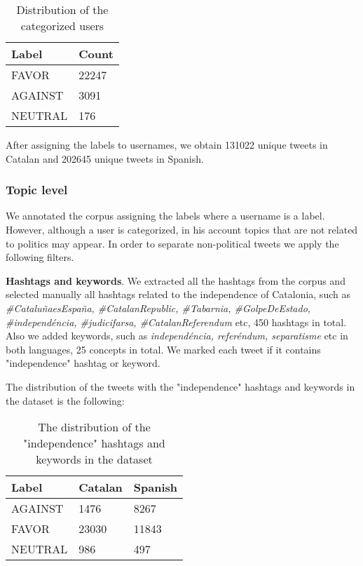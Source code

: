 \documentclass[10pt, a4paper]{article}
\begin{document}
\begin{table}[!h]
\begin{center}
\begin{tabularx}{\columnwidth}{|l|X|}

      \hline
      Label&Count\\
      \hline
      FAVOR & 22247 \\
      \hline
      AGAINST & 3091\\
      \hline
     NEUTRAL & 176\\
      \hline

\end{tabularx}
\caption{Distribution of the categorized users}
\label{table:users}
 \end{center}
\end{table}

After assigning the labels to usernames, we obtain 131022 unique tweets in Catalan and 202645 unique tweets in Spanish. 

\subsubsection{Topic level} 

We annotated the corpus assigning the labels where a username is a label. However, although a user is categorized, in his account topics that are not related to politics may appear. In order to separate non-political tweets we apply the following filters. 

\textbf{Hashtags and keywords}. We extracted all the hashtags from the corpus and selected manually all hashtags related to the independence of Catalonia, such as \textit{\#Catalu\~naesEspa\~na, \#CatalanRepublic, \#Tabarnia, \#GolpeDeEstado, \#independ\'encia, \#judicifarsa, \#CatalanReferendum} etc, 450 hashtags in total. Also we added keywords, such as \textit{independ\'encia, refer\'endum, separatisme} etc in both languages, 25 concepts in total. We marked each tweet if it contains "independence" hashtag or keyword. 

The distribution of the tweets with the "independence" hashtags and keywords in the dataset is the following: 

\begin{table}[!h]
\begin{center}
\begin{tabularx}{\columnwidth}{|l|l|X|}

      \hline
        Label&Catalan&Spanish\\
      \hline
        AGAINST & 1476&8267\\
      \hline
        FAVOR & 23030&11843\\
      \hline
        NEUTRAL & 986&497\\
      \hline

\end{tabularx}
\caption{The distribution of the "independence" hashtags and keywords in the dataset}
 \end{center}
\end{table}
\end{document}
